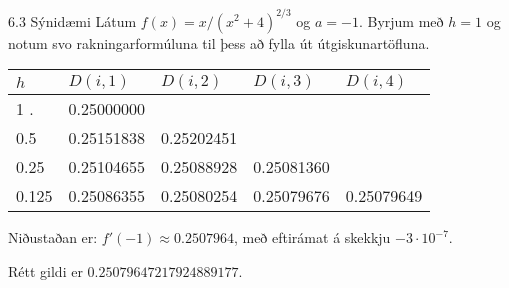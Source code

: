 %     
%    


\begin{frame}{6.3 Sýnidæmi} 
Látum $f(x)=x/(x^2+4)^{2/3}$ og $a=-1$.  
Byrjum með $h=1$ og notum svo rakningarformúluna til þess að fylla út útgiskunartöfluna.

\smallskip
\begin{center}
\begin{tabular}{l|llll}
$h$&$D(i,1)$&$D(i,2)$&$D(i,3)$&$D(i,4)$\\\hline
1   .&   0.25000000 \\
0.5  &   0.25151838 &  0.25202451\\
0.25 &   0.25104655 &  0.25088928 &  0.25081360\\
0.125&   0.25086355 &  0.25080254 &  0.25079676 &  0.25079649
\end{tabular}
\end{center}
\pause

Niðustaðan er: $f'(-1)\approx   0.2507964$, 
með eftirámat á skekkju  $-3\cdot 10^{-7}$.  
\pause
\smallskip

Rétt gildi er $0.25079647217924889177$.
\end{frame}

%

